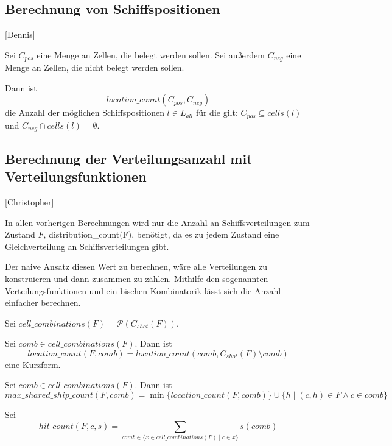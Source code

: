 \documentclass[a4paper,12pt]{llncs}
\numberwithin{equation}{section}
\begin{document}
\subsection{Berechnung von Schiffspositionen}[Dennis]
\begin{definition}
Sei $C_{pos}$ eine Menge an Zellen, die belegt werden sollen. Sei außerdem $C_{neg}$ eine Menge an Zellen, die nicht belegt werden sollen.

Dann ist
\[
location\_count(C_{pos}, C_{neg})
\]
die Anzahl der möglichen Schiffspositionen $l \in L_{all}$ für die gilt: $C_{pos} \subseteq cells(l)$ und $C_{neg} \cap cells(l) = \emptyset$.
\end{definition}

\subsection{Berechnung der Verteilungsanzahl mit Verteilungsfunktionen}[Christopher]

In allen vorherigen Berechnungen wird nur die Anzahl an Schiffsverteilungen zum Zustand $F$, distribution\_count(F), benötigt, da es zu jedem Zustand eine Gleichverteilung an Schiffsverteilungen gibt.

Der naive Ansatz diesen Wert zu berechnen, wäre alle Verteilungen zu konstruieren und dann zusammen zu zählen.
Mithilfe den sogenannten Verteilungsfunktionen und ein bischen Kombinatorik lässt sich die Anzahl einfacher berechnen.

\begin{definition}
Sei $cell\_combinations(F)=\mathcal{P}(C_{shot}(F))$.
\end{definition}

\begin{definition}
Sei $comb \in cell\_combinations(F)$. Dann ist
\[
location\_count(F,comb)=location\_count(comb, C_{shot}(F) \setminus comb)
\]
eine Kurzform.
\end{definition}

\begin{definition}
Sei $comb \in cell\_combinations(F)$. Dann ist
\[
max\_shared\_ship\_count(F,comb)=\min\{location\_count(F, comb)\} \cup \{h \mid (c,h) \in F \wedge c \in comb\}
\]
\end{definition}

\begin{definition}
Sei
\[
hit\_count(F, c, s)=\sum_{comb \in \{x \in cell\_combinations(F) \mid c \in x\}}{s(comb)}
\]
\end{definition}
\end{document}
